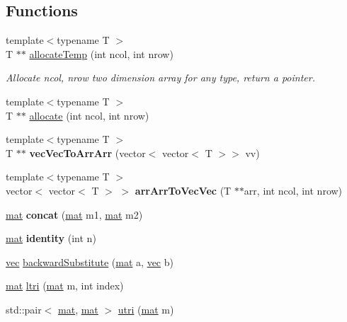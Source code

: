 \subsection*{Functions}
\begin{DoxyCompactItemize}
\item 
{\footnotesize template$<$typename T $>$ }\\T $\ast$$\ast$ \mbox{\hyperlink{namespace_matrix_vector_af94d7bf32de597487458905d7f703d65}{allocate\+Temp}} (int ncol, int nrow)
\begin{DoxyCompactList}\small\item\em Allocate ncol, nrow two dimension array for any type, return a pointer. \end{DoxyCompactList}\item 
{\footnotesize template$<$typename T $>$ }\\T $\ast$$\ast$ \mbox{\hyperlink{namespace_matrix_vector_a26820b913b9a7cc4ef30f3bf085a1560}{allocate}} (int ncol, int nrow)
\item 
\mbox{\label{namespace_matrix_vector_a98c25441f82a0ccac439135b3c20b9ef}} 
{\footnotesize template$<$typename T $>$ }\\T $\ast$$\ast$ {\bfseries vec\+Vec\+To\+Arr\+Arr} (vector$<$ vector$<$ T $>$$>$ vv)
\item 
\mbox{\label{namespace_matrix_vector_a7f927bdfcf1f88f1e33588c9f3c2b861}} 
{\footnotesize template$<$typename T $>$ }\\vector$<$ vector$<$ T $>$ $>$ {\bfseries arr\+Arr\+To\+Vec\+Vec} (T $\ast$$\ast$arr, int ncol, int nrow)
\item 
\mbox{\label{namespace_matrix_vector_ace5f4beedee016c9d35225d8e3785bd3}} 
\mbox{\hyperlink{class_matrix_vector_1_1mat}{mat}} {\bfseries concat} (\mbox{\hyperlink{class_matrix_vector_1_1mat}{mat}} m1, \mbox{\hyperlink{class_matrix_vector_1_1mat}{mat}} m2)
\item 
\mbox{\label{namespace_matrix_vector_af8b4ba38ebf013918af987da1b583b78}} 
\mbox{\hyperlink{class_matrix_vector_1_1mat}{mat}} {\bfseries identity} (int n)
\item 
\mbox{\hyperlink{class_matrix_vector_1_1vec}{vec}} \mbox{\hyperlink{namespace_matrix_vector_a41c576d98e33eb3f60bc286ede16df87}{backward\+Substitute}} (\mbox{\hyperlink{class_matrix_vector_1_1mat}{mat}} a, \mbox{\hyperlink{class_matrix_vector_1_1vec}{vec}} b)
\item 
\mbox{\hyperlink{class_matrix_vector_1_1mat}{mat}} \mbox{\hyperlink{namespace_matrix_vector_af11ba87c88a70108422ac52c75f4e60f}{ltri}} (\mbox{\hyperlink{class_matrix_vector_1_1mat}{mat}} m, int index)
\item 
std\+::pair$<$ \mbox{\hyperlink{class_matrix_vector_1_1mat}{mat}}, \mbox{\hyperlink{class_matrix_vector_1_1mat}{mat}} $>$ \mbox{\hyperlink{namespace_matrix_vector_a21f46727b11ebce5213b7338153274c2}{utri}} (\mbox{\hyperlink{class_matrix_vector_1_1mat}{mat}} m)
\end{DoxyCompactItemize}


